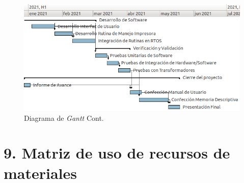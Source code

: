 \documentclass[11pt]{charter}
\begin{document}
\newpage

\begin{figure}[htpb]
\centering 
\includegraphics[width=.8\textwidth]{./Figuras/Gantt_3.png}
\caption{Diagrama de \textit{Gantt} Cont.}
\label{fig:Gantt_3}
\end{figure}

\section{9. Matriz de uso de recursos de materiales}
\label{sec:recursos}
\end{document}
